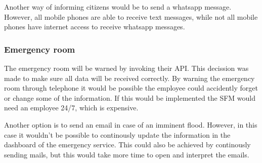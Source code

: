 Another way of informing citizens would be to send a whatsapp message. However, all mobile phones are able to receive text messages, while not all mobile phones have internet access to receive whatsapp messages.  

\subsubsection*{Emergency room}
The emergency room will be warned by invoking their API. This decission was made to make sure all data will be received correctly. By warning the emergency room through telephone it would be possible the employee could accidently forget or change some of the information. If this would be implemented the SFM would need an employee 24/7, which is expensive. 

Another option is to send an email in case of an imminent flood. However, in this case it wouldn't be possible to continously update the information in the dashboard of the emergency service. This could also be achieved by continously sending mails, but this would take more time to open and interpret the emails.

